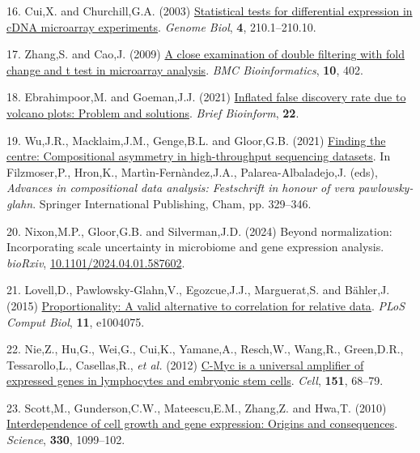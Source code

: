 \documentclass[
]{article}
\newlength{\cslhangindent}
\newenvironment{CSLReferences}[2] %
 {\begin{list}{}{%
  \setlength{\itemindent}{0pt}
  \setlength{\leftmargin}{0pt}
  \setlength{\parsep}{0pt}
  \ifodd #1
   \setlength{\leftmargin}{\cslhangindent}
   \setlength{\itemindent}{-1\cslhangindent}
  \fi
  \setlength{\itemsep}{#2\baselineskip}}}
 {\end{list}}
\begin{document}
\begin{CSLReferences}{1}{1}
16. Cui,X. and Churchill,G.A. (2003)
\href{https://www.ncbi.nlm.nih.gov/pubmed/12702200}{Statistical tests
for differential expression in cDNA microarray experiments}.
\emph{Genome Biol}, \textbf{4}, 210.1--210.10.

17. Zhang,S. and Cao,J. (2009)
\href{https://doi.org/10.1186/1471-2105-10-402}{A close examination of
double filtering with fold change and t test in microarray analysis}.
\emph{BMC Bioinformatics}, \textbf{10}, 402.

18. Ebrahimpoor,M. and Goeman,J.J. (2021)
\href{https://doi.org/10.1093/bib/bbab053}{Inflated false discovery rate
due to volcano plots: Problem and solutions}. \emph{Brief Bioinform},
\textbf{22}.

19. Wu,J.R., Macklaim,J.M., Genge,B.L. and Gloor,G.B. (2021)
\href{https://doi.org/10.1007/978-3-030-71175-7_17}{Finding the centre:
Compositional asymmetry in high-throughput sequencing datasets}. In
Filzmoser,P., Hron,K., Martìn-Fernàndez,J.A., Palarea-Albaladejo,J.
(eds), \emph{Advances in compositional data analysis: Festschrift in
honour of vera pawlowsky-glahn}. Springer International Publishing,
Cham, pp. 329--346.

20. Nixon,M.P., Gloor,G.B. and Silverman,J.D. (2024) Beyond
normalization: Incorporating scale uncertainty in microbiome and gene
expression analysis. \emph{bioRxiv},
\href{https://doi.org/10.1101/2024.04.01.587602}{10.1101/2024.04.01.587602}.

21. Lovell,D., Pawlowsky-Glahn,V., Egozcue,J.J., Marguerat,S. and
Bähler,J. (2015)
\href{https://doi.org/10.1371/journal.pcbi.1004075}{Proportionality: A
valid alternative to correlation for relative data}. \emph{PLoS Comput
Biol}, \textbf{11}, e1004075.

22. Nie,Z., Hu,G., Wei,G., Cui,K., Yamane,A., Resch,W., Wang,R.,
Green,D.R., Tessarollo,L., Casellas,R., \emph{et al.} (2012)
\href{https://doi.org/10.1016/j.cell.2012.08.033}{C-{M}yc is a universal
amplifier of expressed genes in lymphocytes and embryonic stem cells}.
\emph{Cell}, \textbf{151}, 68--79.

23. Scott,M., Gunderson,C.W., Mateescu,E.M., Zhang,Z. and Hwa,T. (2010)
\href{https://doi.org/10.1126/science.1192588}{Interdependence of cell
growth and gene expression: Origins and consequences}. \emph{Science},
\textbf{330}, 1099--102.


\end{CSLReferences}
\end{document}
